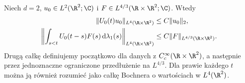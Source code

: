 \begin{twierdzenie}
\label{thm:pde22-strichartz}
Niech $d=2$, $u_0\in L^2(\R^2;\C)$ i
$F\in L^{4/3}(\R\times\R^2;\C)$. Wtedy
\begin{align}
 \|U_0(t)u_0\|_{L^4(\R\times\R^2)}&\le C\|u_0\|_2,
 \label{eq:pde22-str-hom}\\
 \left\|\int_{s<t}U_0(t-s)F(s)\,\mathrm d\lambda_1(s)
 \right\|_{L^4(\R\times\R^2)}&\le
 C\|F\|_{L^{4/3}(\R\times\R^2)}.
 \label{eq:pde22-str-inhom}
\end{align}
Drugą całkę definiujemy początkowo dla danych
z $C_c^\infty(\R\times\R^2)$, a następnie przez
jednoznaczne ograniczone przedłużenie na $L^{4/3}$.
Dla prawie każdego $t$ można ją również rozumieć
jako całkę Bochnera o wartościach w $L^4(\R^2)$.
\end{twierdzenie}

